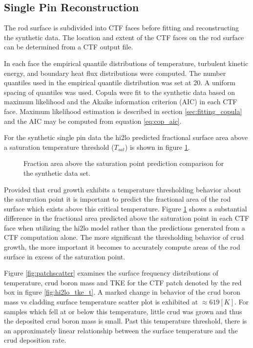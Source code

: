 \subsection{Single Pin Reconstruction}

The rod surface is subdivided into CTF faces before fitting and reconstructing the synthetic data.  The location and extent of the CTF faces on the rod surface can be determined from a CTF output file.  

In each face the empirical quantile distributions of temperature, turbulent kinetic energy, and boundary heat flux distributions were computed.  The number quantiles used in the empirical quantile distribution was set at 20.  A uniform spacing of quantiles was used.  Copula were fit to the synthetic data based on maximum likelihood and the Akaike information criterion (AIC) in each CTF face.  Maximum likelihood estimation is described in section \ref{sec:fitting_copula} and the AIC may be computed from equation \ref{eq:cop_aic}.

For the synthetic single pin data the hi2lo predicted fractional surface area above a saturation temperature threshold ($T_{sat}$) is shown in figure \ref{fig:frac_a}.

\begin{figure}[H]%
    \centering
    \qquad
    \caption[]{Fraction area above the saturation point prediction comparison for the synthetic data set.}%
    \label{fig:frac_a}%
\end{figure}

Provided that crud growth exhibits a temperature thresholding behavior about the saturation point it is important to predict the fractional area of the rod surface which exists above this critical temperature. Figure \ref{fig:frac_a} shows a substantial difference in the fractional area predicted above the saturation point in each CTF face when utilizing the hi2lo model rather than the predictions generated from a CTF computation alone.  The more significant the thresholding behavior of crud growth, the more important it becomes to accurately compute areas of the rod surface in excess of the saturation point.

Figure \ref{fig:patchscatter} examines the surface frequency distributions of temperature, crud boron mass and TKE for the CTF patch denoted by the red box in figure \ref{fig:hi2lo_tke_t}.  A marked change in behavior of the crud boron mass vs cladding surface temperature scatter plot is exhibited at $\approx 619[K]$.  For samples which fell at or below this temperature, little crud was grown and thus the deposited crud boron mass is small.  Past this temperature threshold, there is an approximately linear relationship between the surface temperature and the crud deposition rate.  

